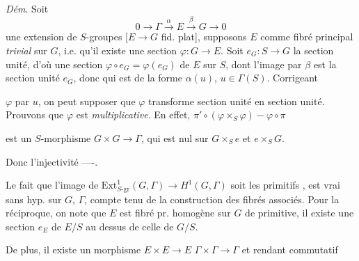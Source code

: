 \documentclass[11pt,a4paper]{article}
\begin{document}
\emph{Dém}. Soit
\[
0 \to \Gamma \xrightarrow{\ \alpha\ } E \xrightarrow{\ \beta\ } G \to 0
\]
une extension de $S$-groupes [$E \to G$ fid. plat], supposons \ill{} \ill{}
$E$ comme fibré principal \emph{trivial} sur $G$, i.e. qu'il existe une
section $\varphi : G \to E$. Soit $e_G : S \to G$ la section unité, d'où une
section $\varphi \circ e_G = \varphi(e_G)$ de $E$ sur $S$, dont l'image par
$\beta$ est la section unité $e_G$, donc qui est de la forme $\alpha(u)$,
$u \in \Gamma(S)$. Corrigeant

$\varphi$ par $u$, on peut supposer que $\varphi$ transforme section unité
en section unité. Prouvons que $\varphi$ est \emph{multiplicative}. En effet,
$\pi' \circ (\varphi \times_S \varphi) - \varphi \circ \pi$


est un $S$-morphisme $G \times G \to \Gamma$, qui est nul sur
$G \times_S e$ et $e \times_S G$.

Donc  l'injectivité ----.

Le fait que l'image de
$\mathrm{Ext}^1_{S\text{-gr}}(G,\Gamma) \to H^1(G,\Gamma)$ soit les primitifs
, est vrai sans hyp. sur $G$, $\Gamma$, compte tenu de la
construction des fibrés associés. Pour la réciproque,
 on note que \struck{\ill{}} $E$ est fibré
pr. homogène sur $G$ \struck{\ill{}} de  primitive, il existe
\struck{\ill{}} une section $e_E$ de $E/S$ au dessus de celle de $G/S$.


De plus, il existe un morphisme $E \times E \to E$ \ill{}
$\Gamma \times \Gamma \to \Gamma$ et rendant commutatif

\end{document}
